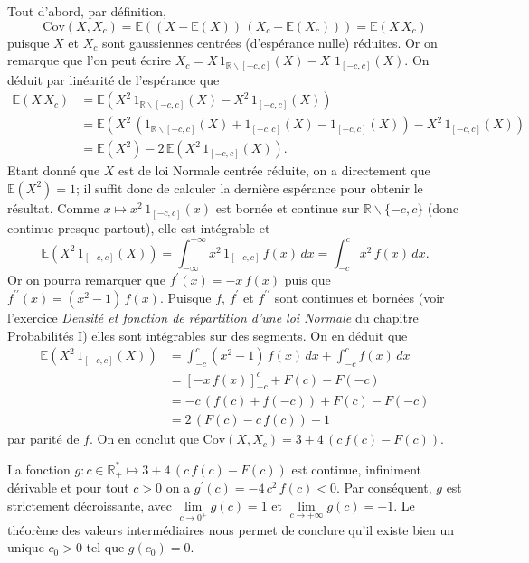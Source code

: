 \label{II-answer-gausssym-cov}
Tout d'abord, par définition,
\[\text{Cov}\left(X,X_c\right) = \mathbb{E}\left( \left(X - \mathbb{E}\left(X\right)\right)\,\left(X_c - \mathbb{E}\left(X_c\right) \right) \right) = \mathbb{E}\left(X\,X_c \right) \]
puisque \(X\) et \(X_c\) sont gaussiennes centrées (d'espérance nulle)
réduites. Or on remarque que l'on peut écrire
\(X_c = X\,1_{\mathbb{R}\backslash[-c,c]}(X) - X\,\,1_{[-c,c]}(X)\). On
déduit par linéarité de l'espérance que \begin{align*}
\mathbb{E}\left(X\,X_c\right) &= \mathbb{E}\left(X^2\,1_{\mathbb{R}\backslash[-c,c]}(X) - X^2\,1_{[-c,c]}(X)\right)\\
&= \mathbb{E}\left(X^2\,\left(1_{\mathbb{R}\backslash[-c,c]}(X) + 1_{[-c,c]}(X) - 1_{[-c,c]}(X)\right) - X^2\,1_{[-c,c]}(X)\right)\\
&= \mathbb{E}\left(X^2\right) - 2\,\mathbb{E}\left(X^2\,1_{[-c,c]}(X)\right).
\end{align*} Etant donné que \(X\) est de loi Normale centrée réduite,
on a directement que \(\mathbb{E}\left(X^2\right)=1\); il suffit donc de
calculer la dernière espérance pour obtenir le résultat. Comme
\(x\mapsto x^2\,1_{[-c,c]}(x)\) est bornée et continue sur
\(\mathbb{R}\backslash\{-c,c\}\) (donc continue presque partout), elle
est intégrable et
\[\mathbb{E}\left(X^2\,1_{[-c,c]}(X)\right) = \int_{-\infty}^{+\infty} x^2\,1_{[-c,c]}\,f(x)\,dx = \int_{-c}^c x^2\,f(x)\,dx. \]
Or on pourra remarquer que \(f^\prime(x) = -x\,f(x)\) puis que
\(f^{\prime\prime}(x) = (x^2-1)\,f(x)\). Puisque \(f\), \(f^\prime\) et
\(f^{\prime\prime}\) sont continues et bornées (voir l'exercice
\emph{Densité et fonction de répartition d'une loi Normale} du chapitre
Probabilités I) elles sont intégrables sur des segments. On en déduit
que \begin{align*}
\mathbb{E}\left(X^2\,1_{[-c,c]}(X)\right) &= \int_{-c}^c (x^2-1)\,f(x)\,dx + \int_{-c}^c f(x)\,dx\\
&= \left[-x\,f(x) \right]_{-c}^c + F(c) - F(-c)\\
&= -c\,\left(f(c) + f(-c)\right) + F(c) - F(-c)\\
&= 2\,\left(F(c) - c\,f(c)\right) - 1
\end{align*} par parité de \(f\). On en conclut que
\(\text{Cov}\left(X,X_c\right) = 3 + 4\,\left(c\,f(c) - F(c)\right)\).

La fonction
\(g : c\in\mathbb{R}_+^\ast \mapsto 3+4\,\left(c\,f(c) - F(c)\right)\)
est continue, infiniment dérivable et pour tout \(c > 0\) on a
\(g^\prime(c) = -4\,c^2\,f(c) < 0\). Par conséquent, \(g\) est
strictement décroissante, avec \(\lim\limits_{c\to0^+} g(c) = 1\) et
\(\lim\limits_{c\to+\infty} g(c) = -1\). Le théorème des valeurs
intermédiaires nous permet de conclure qu'il existe bien un unique
\(c_0 > 0\) tel que \(g(c_0) = 0\).


